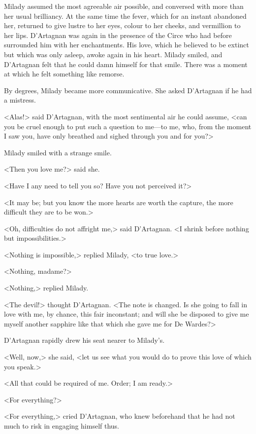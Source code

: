 Milady assumed the most agreeable air possible, and conversed with more than her usual brilliancy. At the same time the fever, which for an instant abandoned her, returned to give lustre to her eyes, colour to her cheeks, and vermillion to her lips. D'Artagnan was again in the presence of the Circe who had before surrounded him with her enchantments. His love, which he believed to be extinct but which was only asleep, awoke again in his heart. Milady smiled, and D'Artagnan felt that he could damn himself for that smile. There was a moment at which he felt something like remorse. 

By degrees, Milady became more communicative. She asked D'Artagnan if he had a mistress. 

<Alas!> said D'Artagnan, with the most sentimental air he could assume, <can you be cruel enough to put such a question to me—to me, who, from the moment I saw you, have only breathed and sighed through you and for you?> 

Milady smiled with a strange smile. 

<Then you love me?> said she. 

<Have I any need to tell you so? Have you not perceived it?> 

<It may be; but you know the more hearts are worth the capture, the more difficult they are to be won.> 

<Oh, difficulties do not affright me,> said D'Artagnan. <I shrink before nothing but impossibilities.> 

<Nothing is impossible,> replied Milady, <to true love.> 

<Nothing, madame?> 

<Nothing,> replied Milady. 

<The devil!> thought D'Artagnan. <The note is changed. Is she going to fall in love with me, by chance, this fair inconstant; and will she be disposed to give me myself another sapphire like that which she gave me for De Wardes?> 

D'Artagnan rapidly drew his seat nearer to Milady's. 

<Well, now,> she said, <let us see what you would do to prove this love of which you speak.> 

<All that could be required of me. Order; I am ready.> 

<For everything?> 

<For everything,> cried D'Artagnan, who knew beforehand that he had not much to risk in engaging himself thus. 

